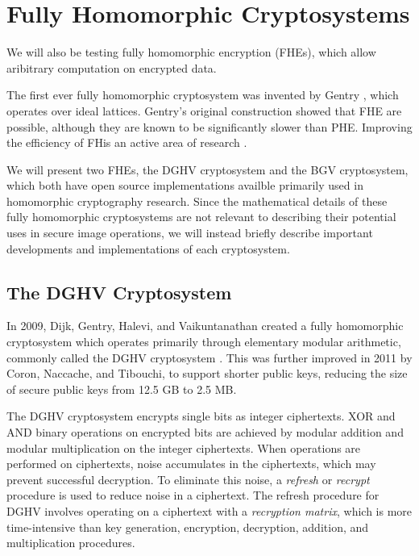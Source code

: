 \section{Fully Homomorphic Cryptosystems}

We will also be testing fully homomorphic encryption (FHEs), which allow aribitrary computation on encrypted data.

The first ever fully homomorphic cryptosystem was invented by Gentry \cite{gentry_fully_2009}, which operates over ideal lattices. Gentry's original construction showed that FHE are possible, although they are known to be significantly slower than PHE.
Improving the efficiency of FHis an active area of research \cite{sen_homomorphic_2013}.

We will present two FHEs, the DGHV cryptosystem and the BGV cryptosystem, which both have open source implementations availble primarily used in homomorphic cryptography research. Since the mathematical details of these fully homomorphic cryptosystems are not relevant to describing their potential uses in secure image operations, we will instead briefly describe important developments and implementations of each cryptosystem.

\subsection{The DGHV Cryptosystem}
In 2009, Dijk, Gentry, Halevi, and Vaikuntanathan created a fully homomorphic cryptosystem which operates primarily through elementary modular arithmetic, commonly called the DGHV cryptosystem \cite{cryptoeprint:2009:616}. This was further improved in 2011 by Coron, Naccache, and Tibouchi, \cite{cryptoeprint:2011:277, cryptoeprint:2011:440} to support shorter public keys, reducing the size of secure public keys from 12.5 GB to 2.5 MB.

The DGHV cryptosystem encrypts single bits as integer ciphertexts. XOR and AND binary operations on encrypted bits are achieved by modular addition and modular multiplication on the integer ciphertexts. When operations are performed on ciphertexts, noise accumulates in the ciphertexts, which may prevent successful decryption. To eliminate this noise, a \textit{refresh} or \textit{recrypt} procedure is used to reduce noise in a ciphertext. The refresh procedure for DGHV involves operating on a ciphertext with a \textit{recryption matrix}, which is more time-intensive than key generation, encryption, decryption, addition, and multiplication procedures.

